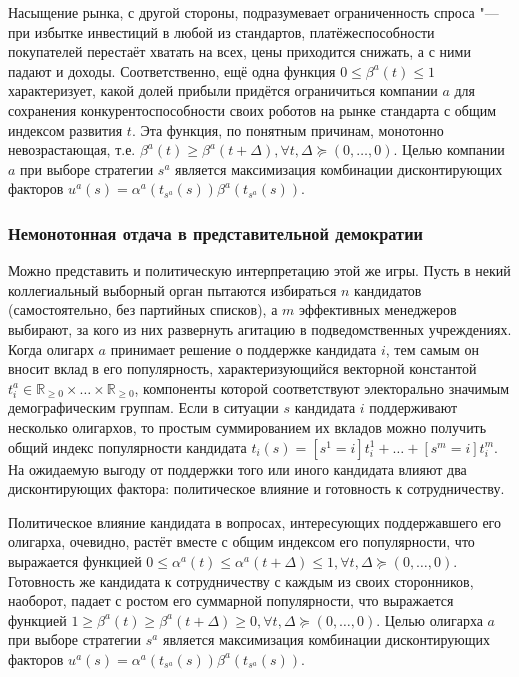 \begin{frame}[allowframebreaks]
	\framebreak
	
	Насыщение рынка, с другой стороны, подразумевает ограниченность спроса "--- при избытке инвестиций в любой из стандартов, платёжеспособности покупателей перестаёт хватать на всех, цены приходится снижать, а с ними падают и доходы. Соответственно, ещё одна функция $0 \le \beta^a(t) \le 1$ характеризует, какой долей прибыли придётся ограничиться компании $a$ для сохранения конкурентоспособности своих роботов на рынке стандарта с общим индексом развития $t$. Эта функция, по понятным причинам, монотонно невозрастающая, т.е. $\beta^a(t) \ge \beta^a(t + \Delta), \forall t, \Delta \succeq (0, \ldots, 0)$. Целью компании $a$ при выборе стратегии $s^a$ является максимизация комбинации дисконтирующих факторов $u^a(s) = \alpha^a(t_{s^a}(s)) \beta^a(t_{s^a}(s))$.
\end{frame}

\begin{frame}[allowframebreaks]
	\frametitle{Немонотонная отдача в представительной демократии}
	Можно представить и политическую интерпретацию этой же игры. Пусть в некий коллегиальный выборный орган пытаются избираться $n$ кандидатов (самостоятельно, без партийных списков), а $m$ эффективных менеджеров выбирают, за кого из них развернуть агитацию в подведомственных учреждениях. Когда олигарх $a$ принимает решение о поддержке кандидата $i$, тем самым он вносит вклад в его популярность, характеризующийся векторной константой $t_i^a \in \mathbb{R}_{\ge 0} \times \ldots \times \mathbb{R}_{\ge 0}$, компоненты которой соответствуют электорально значимым демографическим группам. Если в ситуации $s$ кандидата $i$ поддерживают несколько олигархов, то простым суммированием их вкладов можно получить общий индекс популярности кандидата $t_i(s) = [s^1 = i] t_i^1 + \ldots + [s^m = i] t_i^m$. На ожидаемую выгоду от поддержки того или иного кандидата влияют два дисконтирующих фактора: политическое влияние и готовность к сотрудничеству.
	
	\framebreak
	
	Политическое влияние кандидата в вопросах, интересующих поддержавшего его олигарха, очевидно, растёт вместе с общим индексом его популярности, что выражается функцией $0 \le \alpha^a(t) \le \alpha^a(t + \Delta) \le 1, \forall t, \Delta \succeq (0, \ldots, 0)$. Готовность же кандидата к сотрудничеству с каждым из своих сторонников, наоборот, падает с ростом его суммарной популярности, что выражается функцией $1 \ge \beta^a(t) \ge \beta^a(t + \Delta) \ge 0, \forall t, \Delta \succeq (0, \ldots, 0)$. Целью олигарха $a$ при выборе стратегии $s^a$ является максимизация комбинации дисконтирующих факторов $u^a(s) = \alpha^a(t_{s^a}(s)) \beta^a(t_{s^a}(s))$.
\end{frame}

